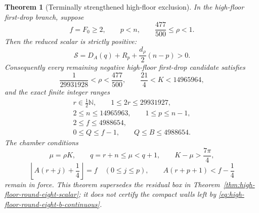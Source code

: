 \documentclass[11pt]{article}
\newtheorem{theorem}{Theorem}[section]
\theoremstyle{remark}
\newcommand{\N}{\mathbb N}
\begin{document}
\begin{theorem}[Terminally strengthened high-floor exclusion]
\label{thm:high-floor-round-eight-b-scalar}
In the high-floor first-drop branch, suppose
\[
 f=F_0\geq2,\qquad p<n,\qquad
 \frac{477}{500}\leq\rho<1.
\]
Then the reduced scalar is strictly positive:
\begin{equation}
 \boxed{
 \mathcal S=D_A(q)+R_p+\frac{d_\rho}{2}(n-p)>0.}
 \label{eq:high-floor-round-eight-b-positive}
\end{equation}
Consequently every remaining negative high-floor first-drop candidate
satisfies
\begin{equation}
 \boxed{
 \frac1{29931928}<\rho<\frac{477}{500},\qquad
 \frac{21}{4}<K<14965964,}
 \label{eq:high-floor-round-eight-b-continuous}
\end{equation}
and the exact finite integer ranges
\begin{equation}
 \boxed{
 \begin{gathered}
 r\in\tfrac12\N,\qquad 1\leq2r\leq29931927,\\
 2\leq n\leq14965963,\qquad 1\leq p\leq n-1,\\
 2\leq f\leq4988654,\\
 0\leq Q\leq f-1,\qquad Q\leq B\leq4988654.
 \end{gathered}}
 \label{eq:high-floor-round-eight-b-discrete}
\end{equation}
The chamber conditions
\begin{equation}
 \mu=\rho K,\qquad q=r+n\leq\mu<q+1,\qquad
 K-\mu>\frac{7\pi}{4},
 \label{eq:high-floor-round-eight-b-chamber-one}
\end{equation}
\begin{equation}
 \left\lfloor A(r+j)+\frac14\right\rfloor=f
 \quad(0\leq j\leq p),\qquad
 A(r+p+1)<f-\frac14
 \label{eq:high-floor-round-eight-b-chamber-two}
\end{equation}
remain in force.  This theorem supersedes the residual box in
Theorem~\ref{thm:high-floor-round-eight-scalar}; it does not certify the
compact walls left by \eqref{eq:high-floor-round-eight-b-continuous}.
\end{theorem}
\end{document}
